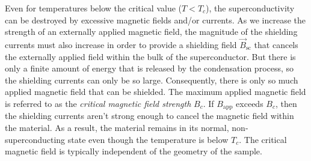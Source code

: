 %


Even for temperatures below the critical value ($T < T_c$), the
superconductivity can be destroyed by excessive magnetic fields and/or
currents.  As we increase the strength of an externally applied
magnetic field, the magnitude of the shielding currents must also
increase in order to provide a shielding field $\vec B_\text{sc}$ that
cancels the externally applied field within the bulk of the
superconductor.  But there is only a finite amount of energy that is
released by the condensation process, so the shielding currents can
only be so large.  Consequently, there is only so much applied
magnetic field that can be shielded.  The maximum applied magnetic
field is referred to as the {\em critical magnetic field strength}
$B_c$.  If $B_\text{app}$ exceeds $B_c$, then the shielding currents aren't
strong enough to cancel the magnetic field within the material.  As a
result, the material remains in its normal, non-superconducting state
even though the temperature is below $T_c$.  The critical magnetic
field is typically independent of the geometry of the sample.


